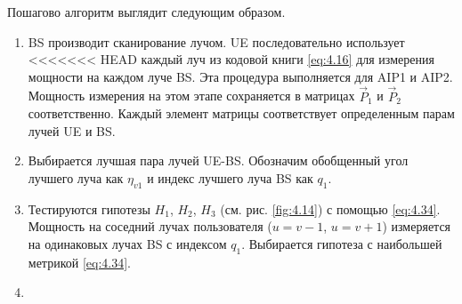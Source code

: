 Пошагово алгоритм выглядит следующим образом. 
\begin{enumerate}[label=\textbf{Шаг \arabic*:}]
    \item BS производит сканирование лучом. UE последовательно использует
<<<<<<< HEAD
    каждый луч из кодовой книги \eqref{eq:4.16} для измерения мощности на каждом луче BS.
    Эта процедура выполняется для AIP1 и AIP2. Мощность измерения на этом этапе сохраняется в
    матрицах $\vec P_1$ и $\vec P_2$ соответственно. Каждый элемент матрицы соответствует
    определенным парам лучей UE и BS.
    \item Выбирается лучшая пара лучей UE-BS. Обозначим обобщенный угол лучшего луча как $\eta_{v1}$ и индекс лучшего луча BS как 
    $q_1$. 
    \item Тестируются гипотезы $H_1$, $H_2$, $H_3$ (см. рис. \ref{fig:4.14}) с помощью \eqref{eq:4.34}. Мощность на соседний лучах пользователя 
    ($u=v-1$, $u=v+1$) измеряется на одинаковых лучах BS с индексом $q_1$. Выбирается гипотеза с наибольшей метрикой \eqref{eq:4.34}.
    \item 
\end{enumerate}

